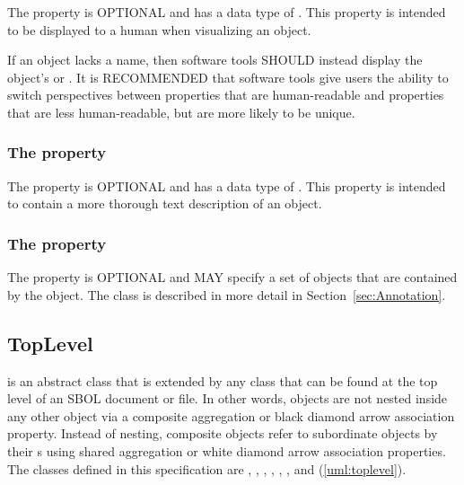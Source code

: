 The  property is OPTIONAL and has a data type of . This property is intended to be displayed to a human when visualizing an  object.

If an  object lacks a name, then software tools SHOULD instead display the object's  or .
It is RECOMMENDED that software tools give users the ability to switch perspectives between  properties that are human-readable and  properties that are less human-readable, but are more likely to be unique.

\subsubsection*{The  property}
\label{sec:description}

The  property is OPTIONAL and has a data type of . This property is intended to contain a more thorough text description of an  object.

\subsubsection*{The  property}
\label{sec:annotations}

The  property is OPTIONAL and MAY specify a set of  objects that are contained by the  object. The  class is described in more detail in Section~\ref{sec:Annotation}.

\subsection {TopLevel}
\label{sec:TopLevel}
 is an abstract class that is extended by any  class that can be found at the top level of an SBOL document or file. In other words,  objects are not nested inside any other object via a composite aggregation or black diamond arrow association property. Instead of nesting, composite  objects refer to subordinate  objects by their s using shared aggregation or white diamond arrow association properties. The  classes defined in this specification are , , , , , , and (\ref{uml:toplevel}).


